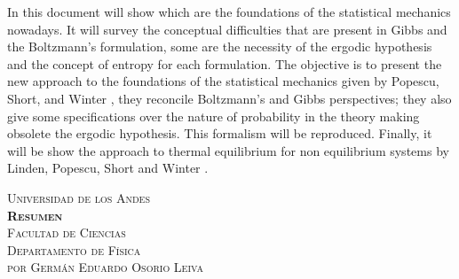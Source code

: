 \documentclass[11pt]{book}
\theoremstyle{definition}
\begin{document}
\vspace*{4em}
In this document will show which are the foundations of the statistical mechanics nowadays. It will survey the conceptual difficulties that are present in Gibbs and the Boltzmann's formulation, some are the necessity of the ergodic hypothesis and the concept of entropy for each formulation. The objective is to present the new approach to the foundations of the statistical mechanics given by Popescu, Short, and Winter \cite{Popescu2006}, they reconcile Boltzmann's and Gibbs perspectives; they also give some specifications over the nature of probability in the theory making obsolete the ergodic hypothesis. This formalism will be reproduced. Finally, it will be show the approach to thermal equilibrium for non equilibrium  systems by Linden, Popescu, Short and Winter \cite{LindenPaper}.



\newpage

\begin{center}
\vspace*{5em}
\textsc{\normalsize Universidad de los Andes}\\[1em]

\textsc{\large \textbf{Resumen}}\\[1em]

\textsc{\normalsize Facultad de Ciencias}\\[1em]

\textsc{\normalsize Departamento de Física}\\[1em]

\textsc{\small por Germán Eduardo Osorio Leiva}
\end{center}
\end{document}
